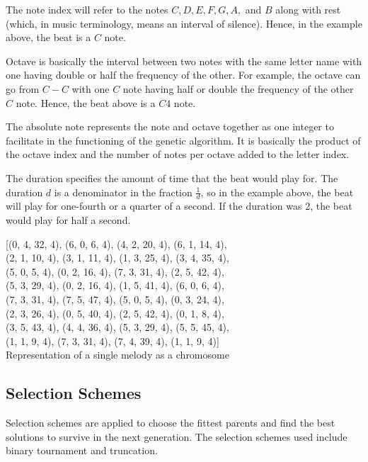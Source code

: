 \documentclass[conference]{IEEEtran}
\begin{document}
The note index will refer to the notes $C, D, E, F, G, A,$ and $B$ along with rest (which, in music terminology, means an interval of silence). Hence, in the example above, the beat is a $C$ note.

Octave is basically the interval between two notes with the same letter name with one having double or half the frequency of the other. For example, the octave can go from $C-C$ with one $C$ note having half or double the frequency of the other $C$ note. Hence, the beat above is a $C4$ note.

The absolute note represents the note and octave together as one integer to facilitate in the functioning of the genetic algorithm. It is basically the product of the octave index and the number of notes per octave added to the letter index.

The duration specifies the amount of time that the beat would play for. The duration $d$ is a denominator in the fraction $\frac{1}{d}$, so in the example above, the beat will play for one-fourth or a quarter of a second. If the duration was 2, the beat would play for half a second.

\begin{center}
    [(0, 4, 32, 4), (6, 0, 6, 4), (4, 2, 20, 4), (6, 1, 14, 4),\\ (2, 1, 10, 4), (3, 1, 11, 4), (1, 3, 25, 4), (3, 4, 35, 4),\\ (5, 0, 5, 4), (0, 2, 16, 4), (7, 3, 31, 4), (2, 5, 42, 4),\\ (5, 3, 29, 4), (0, 2, 16, 4), (1, 5, 41, 4), (6, 0, 6, 4),\\ (7, 3, 31, 4), (7, 5, 47, 4), (5, 0, 5, 4), (0, 3, 24, 4),\\ (2, 3, 26, 4), (0, 5, 40, 4), (2, 5, 42, 4), (0, 1, 8, 4),\\ (3, 5, 43, 4), (4, 4, 36, 4), (5, 3, 29, 4), (5, 5, 45, 4),\\ (1, 1, 9, 4), (7, 3, 31, 4), (7, 4, 39, 4), (1, 1, 9, 4)]\\
    
    Representation of a single melody as a chromosome
\end{center}

\subsection{Selection Schemes}
Selection schemes are applied to choose the fittest parents and find the best solutions to survive in the next generation. The selection schemes used include binary tournament and truncation.
\end{document}
